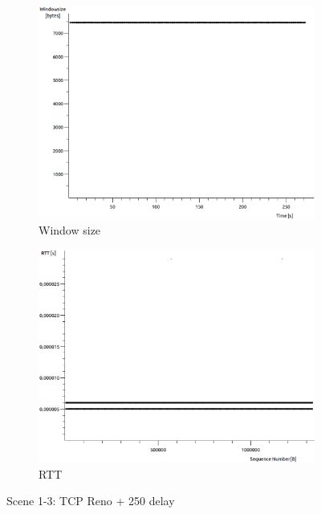\documentclass[conference,a4paper]{IEEEtran}
\begin{document}
\begin{figure}
\begin{subfigure}[b]{0.2\textwidth}
  \includegraphics[width=\textwidth]{s1-3_wnd}
  \caption{Window size}
 \end{subfigure}
 \begin{subfigure}[b]{0.2\textwidth}
  \includegraphics[width=\textwidth]{s1-3_rtt}
  \caption{RTT}
 \end{subfigure}
 \caption{Scene 1-3: TCP Reno + 250 delay}
\end{figure}
\end{document}
